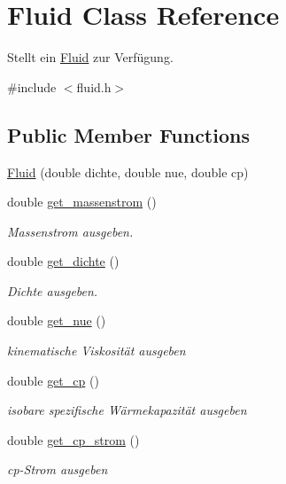 \hypertarget{class_fluid}{}\section{Fluid Class Reference}
\label{class_fluid}


Stellt ein \hyperlink{class_fluid}{Fluid} zur Verfügung.  




{\ttfamily \#include $<$fluid.\+h$>$}

\subsection*{Public Member Functions}
\begin{DoxyCompactItemize}
\item 
\hyperlink{class_fluid_a2b1fada8a43d2edf1424e4f5915d6e06}{Fluid} (double dichte, double nue, double cp)
\item 
double \hyperlink{class_fluid_afd9451c48ea66d15fdb8226da58da28e}{get\+\_\+massenstrom} ()
\begin{DoxyCompactList}\small\item\em Massenstrom ausgeben. \end{DoxyCompactList}\item 
double \hyperlink{class_fluid_acb9e3346c0871ad5fefc9d11dcfc3283}{get\+\_\+dichte} ()
\begin{DoxyCompactList}\small\item\em Dichte ausgeben. \end{DoxyCompactList}\item 
double \hyperlink{class_fluid_ae0031c0e8f70a4fb3dacc34c9725c3c1}{get\+\_\+nue} ()
\begin{DoxyCompactList}\small\item\em kinematische Viskosität ausgeben \end{DoxyCompactList}\item 
double \hyperlink{class_fluid_a86bf10785c4c5822eabf9245f0b39ae0}{get\+\_\+cp} ()
\begin{DoxyCompactList}\small\item\em isobare spezifische Wärmekapazität ausgeben \end{DoxyCompactList}\item 
double \hyperlink{class_fluid_a5c589565d1bde26bc83125e3e8939796}{get\+\_\+cp\+\_\+strom} ()
\begin{DoxyCompactList}\small\item\em cp-\/\+Strom ausgeben \end{DoxyCompactList}\item 

\end{DoxyCompactItemize}
